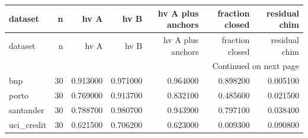 \begin{center}\label{tab:s12}\end{center}
\begingroup\scriptsize\setlength{\tabcolsep}{2.5pt}
\begin{longtable}{lrrrrrr}
\toprule
dataset & n & hv A & hv B & hv A plus anchors & fraction closed & residual chim \\
\midrule
\endfirsthead
\toprule
dataset & n & hv A & hv B & hv A plus anchors & fraction closed & residual chim \\
\midrule
\endhead
\midrule
\multicolumn{7}{r}{Continued on next page} \\
\midrule
\endfoot
\bottomrule
\endlastfoot
bnp & 30 & 0.913000 & 0.971000 & 0.964000 & 0.898200 & 0.005100 \\
porto & 30 & 0.769000 & 0.913700 & 0.832100 & 0.485600 & 0.021500 \\
santander & 30 & 0.788700 & 0.980700 & 0.943900 & 0.797100 & 0.038400 \\
uci\_credit & 30 & 0.621500 & 0.706200 & 0.623000 & 0.009300 & 0.090800 \\
\end{longtable}\endgroup\addtocounter{table}{-1}
